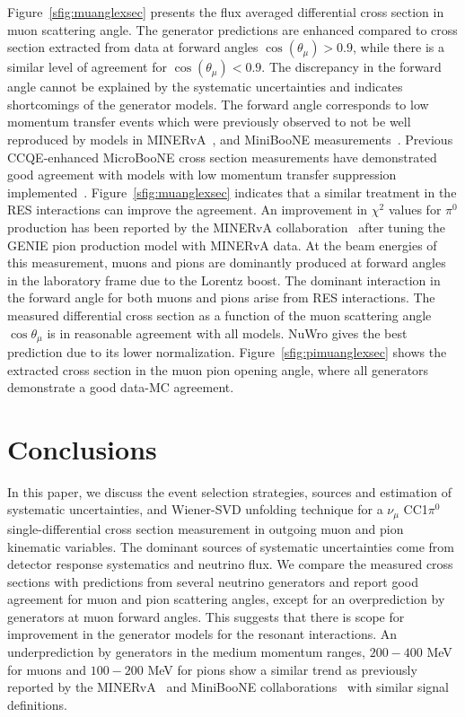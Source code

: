 \documentclass[%
 reprint,
 amsmath,amssymb, longbibliography,
 aps, 
 prd,
 twocolumn,
 showpacs,
 superscriptaddress
]{revtex4-2}
\begin{document}
Figure~\ref{sfig:muanglexsec} presents the flux averaged differential cross section in muon scattering angle. The generator predictions are enhanced compared to cross section extracted from data at forward angles $\cos(\theta_{\mu}) > 0.9 $, while there is a similar level of agreement for $\cos(\theta_{\mu}) < 0.9 $. The discrepancy in the forward angle cannot be explained by the systematic uncertainties and indicates shortcomings of the generator models. The forward angle corresponds to low momentum transfer events which were previously observed to not be well reproduced by models in MINERvA~\cite{PhysRevD.96.072003}, and MiniBooNE measurements~\cite{PhysRevD.83.052009}. Previous CCQE-enhanced MicroBooNE cross section measurements have demonstrated good agreement with models with low momentum transfer suppression implemented~\cite{PhysRevD.108.053002}. Figure~\ref{sfig:muanglexsec} indicates that a similar treatment in the RES interactions can improve the agreement. An improvement in $\chi^2$ values for $\pi^0$ production has been reported by the MINERvA collaboration~\cite{PhysRevD.100.072005} after tuning the GENIE pion production model with MINERvA data. At the beam energies of this measurement, muons and pions are dominantly produced at forward angles in the laboratory frame due to the Lorentz boost. The dominant interaction in the forward angle for both muons and pions arise from RES interactions. The measured differential cross section as a function of the muon scattering angle $\cos\theta_{\mu}$ is in reasonable agreement with all models. NuWro gives the best prediction due to its lower normalization. Figure~\ref{sfig:pimuanglexsec} shows the extracted cross section in the muon pion opening angle, where all generators demonstrate a good data-MC agreement.

\section{Conclusions}
In this paper, we discuss the event selection strategies, sources and estimation of systematic uncertainties, and Wiener-SVD unfolding technique for a $\nu_{\mu}$ CC1$\pi^0$ single-differential cross section measurement in outgoing muon and pion kinematic variables. The dominant sources of systematic uncertainties come from detector response systematics and neutrino flux. We compare the measured cross sections with predictions from several neutrino generators and report good agreement for muon and pion scattering angles, except for an overprediction by generators at muon forward angles. This suggests that there is scope for improvement in the generator models for the resonant interactions. An underprediction by generators in the medium momentum ranges, $200 - 400$ MeV for muons and $100 - 200$ MeV for pions show a similar  trend as previously reported by the MINERvA~\cite{PhysRevD.96.072003} and MiniBooNE collaborations~\cite{PhysRevD.83.052009} with similar signal definitions. 
 
\end{document}
